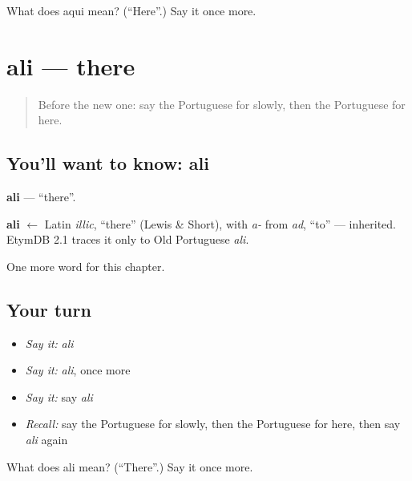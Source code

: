 \begin{tcolorbox}[breakable,colback=teal!4,colframe=teal!35!black,title={Before you move on}]
What does aqui mean? (\textquotedblleft{}Here\textquotedblright{}.) Say it once more.
\end{tcolorbox}
\section[ali]{ali — there}

\label{lesson:PT-C72-ali}



\begin{quote}
Before the new one: say the Portuguese for slowly, then the Portuguese for here.
\end{quote}

\subsection*{You'll want to know: ali}
\textbf{ali} — \textquotedblleft{}there\textquotedblright{}.

\begin{cousinweb}
\textbf{ali} $\leftarrow$ Latin \emph{illic}, \textquotedblleft{}there\textquotedblright{} (Lewis \& Short), with \emph{a-} from \emph{ad}, \textquotedblleft{}to\textquotedblright{} — inherited. EtymDB 2.1 traces it only to Old Portuguese \emph{ali}.
\end{cousinweb}

\begin{grammarlens}[title={What you've built}]
One more word for this chapter.
\end{grammarlens}

\subsection*{Your turn}
\begin{itemize}
\raggedright
  \item \emph{Say it:} \emph{ali}
  \item \emph{Say it:} \emph{ali}, once more
  \item \emph{Say it:} say \emph{ali}
  \item \emph{Recall:} say the Portuguese for slowly, then the Portuguese for here, then say \emph{ali} again
\end{itemize}

\begin{tcolorbox}[breakable,colback=teal!4,colframe=teal!35!black,title={Before you move on}]
What does ali mean? (\textquotedblleft{}There\textquotedblright{}.) Say it once more.
\end{tcolorbox}
